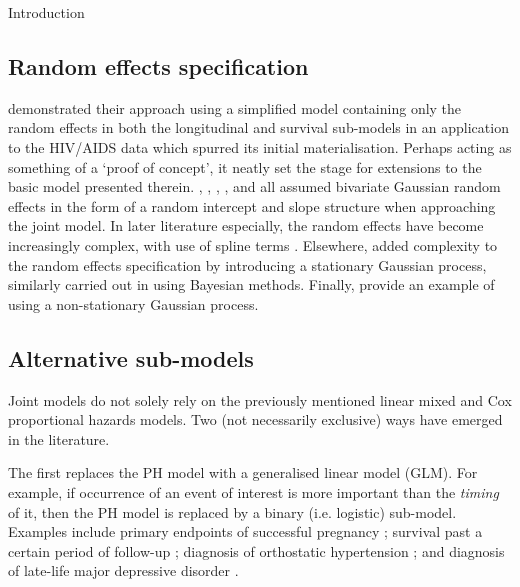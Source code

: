 \begin{chapter}{\label{cha:intro}Introduction}
  \subsection{Random effects specification}\label{sec:intro-evolution-REs}
  \citet{Wulfsohn97} demonstrated their approach using a simplified model containing only the random effects in both the longitudinal and survival sub-models in an application to the HIV/AIDS data which spurred its initial materialisation. Perhaps acting as something of a `proof of concept', it neatly set the stage for extensions to the basic model presented therein. \citet{Tsiatis1995}, \citet{Faucett1996}, \citet{Bycott1998}, \citet{Dafni1998}, and \citet{Wulfsohn97} all assumed bivariate Gaussian random effects in the form of a random intercept and slope structure when approaching the joint model. In later literature especially, the random effects have become increasingly complex, with use of \eg spline terms \citep{Martins2022, Rustand2023}. Elsewhere, \citet{Henderson2000} added complexity to the random effects specification by introducing a stationary Gaussian process, similarly carried out in \citet{Xu2001} using Bayesian methods. Finally, \citet{Wang2001} provide an example of using a non-stationary Gaussian process. 

  \subsection{Alternative sub-models}\label{sec:intro-evolution-glmm}
  Joint models do not solely rely on the previously mentioned linear mixed and Cox proportional hazards models. Two (not necessarily exclusive) ways have emerged in the literature.

  The first replaces the PH model with a generalised linear model (GLM). For example, if occurrence of an event of interest is more important than the \textit{timing} of it, then the PH model is replaced by a binary (i.e. logistic) sub-model. Examples include primary endpoints of successful pregnancy \citep{Horrocks2009}; survival past a certain period of follow-up \citep{Bernhardt15}; diagnosis of orthostatic hypertension \citep{Hwang2011, Hwang2015}; and diagnosis of late-life major depressive disorder \citep{li2015flexible}.


\end{chapter}
